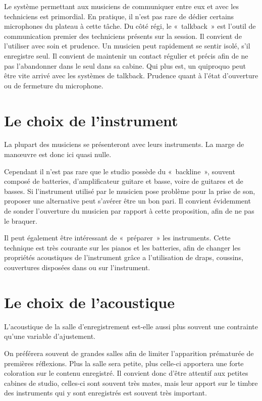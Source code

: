 \documentclass[
]{book}
\begin{document}
Le système permettant aux musiciens de communiquer entre eux et avec les techniciens est primordial. En pratique, il n'est pas rare de dédier certains microphones du plateau à cette tâche. Du côté régi, le «~talkback~» est l'outil de communication premier des techniciens présents sur la session. Il convient de l'utiliser avec soin et prudence. Un musicien peut rapidement se sentir isolé, s'il enregistre seul. Il convient de maintenir un contact régulier et précis afin de ne pas l'abandonner dans le seul dans sa cabine. Qui plus est, un quiproquo peut être vite arrivé avec les systèmes de talkback. Prudence quant à l'état d'ouverture ou de fermeture du microphone.

\hypertarget{le-choix-de-linstrument}{%
\section{Le choix de l'instrument}\label{le-choix-de-linstrument}}

La plupart des musiciens se présenteront avec leurs instruments. La marge de manœuvre est donc ici quasi nulle.

Cependant il n'est pas rare que le studio possède du «~backline~», souvent composé de batteries, d'amplificateur guitare et basse, voire de guitares et de basses. Si l'instrument utilisé par le musicien pose problème pour la prise de son, proposer une alternative peut s'avérer être un bon pari. Il convient évidemment de sonder l'ouverture du musicien par rapport à cette proposition, afin de ne pas le braquer.

Il peut également être intéressant de «~préparer~» les instruments. Cette technique est très courante sur les pianos et les batteries, afin de changer les propriétés acoustiques de l'instrument grâce a l'utilisation de draps, coussins, couvertures disposées dans ou sur l'instrument.

\hypertarget{le-choix-de-lacoustique}{%
\section{Le choix de l'acoustique}\label{le-choix-de-lacoustique}}

L'acoustique de la salle d'enregistrement est-elle aussi plus souvent une contrainte qu'une variable d'ajustement.

On préférera souvent de grandes salles afin de limiter l'apparition prématurée de premières réflexions. Plus la salle sera petite, plus celle-ci apportera une forte coloration sur le contenu enregistré. Il convient donc d'être attentif aux petites cabines de studio, celles-ci sont souvent très mates, mais leur apport sur le timbre des instruments qui y sont enregistrés est souvent très important.
\end{document}
